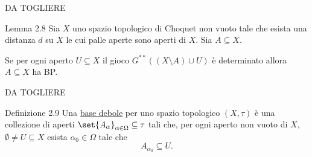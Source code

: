 \documentclass[babel]{beamer}
\renewcommand{\href}[2]{#2}
\begin{document}
\begin{frame}[label={sec:org36ff494}]{DA TOGLIERE}
\begin{alertblock}{Lemma 2.8}
Sia \(X\) uno \href{../../../../../../../org/roam/20250103145124-topologia.org}{spazio topologico} \href{../../../../../../../org/roam/20250514174255-gioco_di_choquet.org}{di Choquet} non \href{../../../../../../../org/roam/20250131161811-insieme_vuoto_mk.org}{vuoto} tale che esista una \href{../../../../../../../org/roam/20250301193511-spazio_metrico.org}{distanza} \(d\) su \(X\) le cui \href{../../../../../../../org/roam/20250301193511-spazio_metrico.org}{palle aperte} sono aperti di \(X\). Sia \(A \subseteq X\).

Se per ogni aperto \(U \subseteq X\) il \href{../../../../../../../org/roam/20250513111844-gioco_di_banach_mazur.org}{gioco} \(G^{**}\left((X\setminus A)\cup U\right)\) è \href{../../../../../../../org/roam/20250513155732-logic_game.org}{determinato} allora \(A \subseteq X\) ha \href{../../../../../../../org/roam/20250514154039-proprieta_di_baire.org}{BP}.
\end{alertblock}
\end{frame}
\begin{frame}[label={sec:org51bbdfe}]{DA TOGLIERE}
\begin{block}{Definizione 2.9}
Una \uline{base debole} per uno spazio topologico \((X,\tau)\) è una collezione di aperti \(\set{A_{\alpha}}_{\alpha \in \Omega} \subseteq \tau\) tali che, per ogni aperto non vuoto di \(X\), \(\emptyset\neq U \subseteq X\) esista \(\alpha_{0} \in \Omega\) tale che
\begin{equation*}
A_{\alpha_{0}} \subseteq U.
\end{equation*}
\end{block}
\end{frame}
\end{document}
